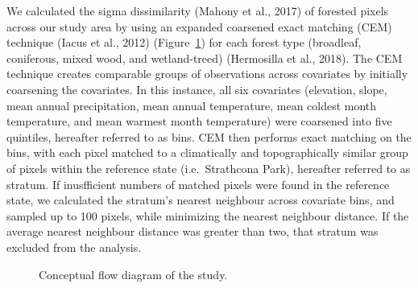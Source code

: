 \documentclass[
]{agujournal2019}
\begin{document}
We calculated the sigma dissimilarity (Mahony et al., 2017) of forested
pixels across our study area by using an expanded coarsened exact
matching (CEM) technique (Iacus et al., 2012) (Figure~\ref{fig-flow})
for each forest type (broadleaf, coniferous, mixed wood, and
wetland-treed) (Hermosilla et al., 2018). The CEM technique creates
comparable groups of observations across covariates by initially
coarsening the covariates. In this instance, all six covariates
(elevation, slope, mean annual precipitation, mean annual temperature,
mean coldest month temperature, and mean warmest month temperature) were
coarsened into five quintiles, hereafter referred to as bins. CEM then
performs exact matching on the bins, with each pixel matched to a
climatically and topographically similar group of pixels within the
reference state (i.e.~Strathcona Park), hereafter referred to as
stratum. If inusfficient numbers of matched pixels were found in the
reference state, we calculated the stratum's nearest neighbour across
covariate bins, and sampled up to 100 pixels, while minimizing the
nearest neighbour distance. If the average nearest neighbour distance
was greater than two, that stratum was excluded from the analysis.

\label{cell-fig-flow}
\begin{figure}[H]


\caption{\label{fig-flow}Conceptual flow diagram of the study.}

\end{figure}%
\end{document}
